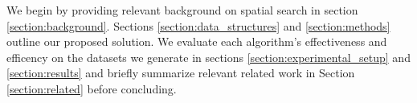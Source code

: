 {    We begin by providing relevant background on spatial search in section \ref{section:background}. Sections \ref{section:data_structures} and \ref{section:methods} outline our proposed solution. We evaluate each algorithm's effectiveness and efficency on the datasets we generate in sections \ref{section:experimental_setup} and \ref{section:results} and briefly summarize relevant related work in Section \ref{section:related} before concluding.
}



%



